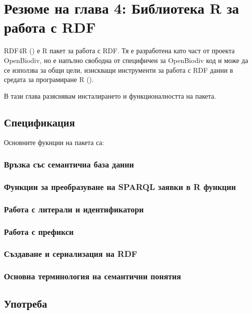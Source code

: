 \chapter{Резюме на глава 4: Библиотека R за работа с RDF}
\label{chapter-rdf4r}

RDF4R () е R пакет за работа с RDF. Тя е разработена като част от проекта OpenBiodiv, но е напълно свободна от специфичен за OpenBiodiv код и може да се използва за общи цели, изискващи инструменти за работа с RDF данни в средата за програмиране R (\cite {r_core_team_r: _2016}).

В тази глава разяснявам инсталирането и функционалността на пакета.

\section{Спецификация}

Основните фукнции на пакета са:

\subsection{Връзка със семантична база данни}

\subsection{Функции за преобразуване на SPARQL заявки в R функции}

\subsection{Работа с литерали и идентификатори}

\subsection{Работа с префикси}

\subsection{Създаване и сериализация на RDF}

\subsection{Основна терминология на семантични понятия}

\section{Употреба}

